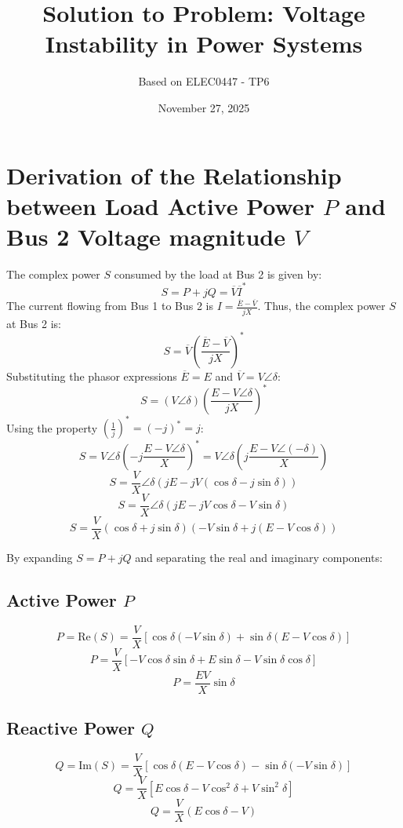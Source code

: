 \documentclass{article}
\title{Solution to Problem: Voltage Instability in Power Systems}
\author{Based on ELEC0447 - TP6}
\date{November 27, 2025}
\begin{document}
\maketitle


\section{Derivation of the Relationship between Load Active Power $P$ and Bus 2 Voltage magnitude $V$}

The complex power $S$ consumed by the load at Bus 2 is given by:
$$S = P + jQ = \overline{V} \overline{I}^*$$
The current flowing from Bus 1 to Bus 2 is $I = \frac{\overline{E} - \overline{V}}{jX}$.
Thus, the complex power $S$ at Bus 2 is:
$$S = \overline{V} \left( \frac{\overline{E} - \overline{V}}{jX} \right)^*$$
Substituting the phasor expressions $\overline{E} = E$ and $\overline{V} = V\angle\delta$:
$$S = (V\angle\delta) \left( \frac{E - V\angle\delta}{jX} \right)^*$$
Using the property $\left(\frac{1}{j}\right)^* = (-j)^* = j$:
$$S = V\angle\delta \left( -j \frac{E - V\angle\delta}{X} \right)^* = V\angle\delta \left( j \frac{E - V\angle(-\delta)}{X} \right)$$
$$S = \frac{V}{X} \angle\delta \left( j E - j V(\cos\delta - j\sin\delta) \right)$$
$$S = \frac{V}{X} \angle\delta \left( j E - j V\cos\delta - V\sin\delta \right)$$
$$S = \frac{V}{X} (\cos\delta + j\sin\delta) \left( -V\sin\delta + j(E - V\cos\delta) \right)$$

By expanding $S=P+jQ$ and separating the real and imaginary components:
\subsection*{Active Power $P$}
$$P = \text{Re}(S) = \frac{V}{X} \left[ \cos\delta (-V\sin\delta) + \sin\delta (E - V\cos\delta) \right]$$
$$P = \frac{V}{X} \left[ -V\cos\delta\sin\delta + E\sin\delta - V\sin\delta\cos\delta \right]$$
\begin{equation}
    P = \frac{EV}{X} \sin\delta
    \label{eq:P}
\end{equation}

\subsection*{Reactive Power $Q$}
$$Q = \text{Im}(S) = \frac{V}{X} \left[ \cos\delta (E - V\cos\delta) - \sin\delta (-V\sin\delta) \right]$$
$$Q = \frac{V}{X} \left[ E\cos\delta - V\cos^2\delta + V\sin^2\delta \right]$$
\begin{equation}
    Q = \frac{V}{X} (E\cos\delta - V)
    \label{eq:Q}
\end{equation}
\end{document}
